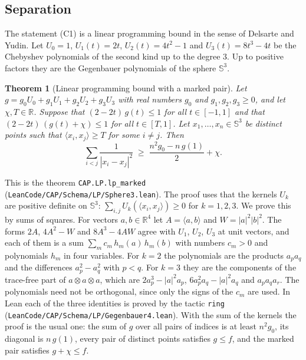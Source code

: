 \documentclass[reqno,a4paper,11pt]{amsart}
\numberwithin{equation}{section}
\newtheorem{theorem}{Theorem}[section]
\def\R{{\mathbb R}}
\newcommand{\Sph}{\mathbb{S}}
\newcommand{\lean}[1]{\texttt{#1}}
\newcommand{\file}[1]{\nolinkurl{#1}}
\begin{document}
\subsection{Separation}\label{sec:s3n9sep}

The statement (C1) is a linear programming bound in the sense of Delsarte and Yudin. Let $U_0 = 1$, $U_1(t) = 2t$, $U_2(t) = 4t^2 - 1$ and $U_3(t) = 8t^3 - 4t$ be the Chebyshev polynomials of the second kind up to the degree $3$. Up to positive factors they are the Gegenbauer polynomials of the sphere $\Sph^3$.

\begin{theorem}[Linear programming bound with a marked pair]\label{thm:lpmarked}
Let $g = g_0 U_0 + g_1 U_1 + g_2 U_2 + g_3 U_3$ with real numbers $g_0$ and $g_1, g_2, g_3 \geq 0$, and let $\chi, T \in \R$. Suppose that $(2-2t) \, g(t) \leq 1$ for all $t \in [-1,1]$ and that $(2-2t) \, (g(t) + \chi) \leq 1$ for all $t \in [T,1]$. Let $x_1, \dots, x_n \in \Sph^3$ be distinct points such that $\langle x_i, x_j \rangle \geq T$ for some $i \neq j$. Then
$$
\sum_{i<j} \frac{1}{|x_i - x_j|^2} \;\geq\; \frac{n^2 g_0 - n \, g(1)}{2} + \chi .
$$
\end{theorem}

This is the theorem \lean{CAP.LP.lp\_marked} (\file{LeanCode/CAP/Schema/LP/Sphere3.lean}). The proof uses that the kernels $U_k$ are positive definite on $\Sph^3$: $\sum_{i,j} U_k(\langle x_i, x_j \rangle) \geq 0$ for $k = 1, 2, 3$. We prove this by sums of squares. For vectors $a, b \in \R^4$ let $A = \langle a, b \rangle$ and $W = |a|^2 |b|^2$. The forms $2A$, $4A^2 - W$ and $8A^3 - 4AW$ agree with $U_1$, $U_2$, $U_3$ at unit vectors, and each of them is a sum $\sum_m c_m \, h_m(a) \, h_m(b)$ with numbers $c_m > 0$ and polynomials $h_m$ in four variables. For $k = 2$ the polynomials are the products $a_p a_q$ and the differences $a_p^2 - a_q^2$ with $p < q$. For $k = 3$ they are the components of the trace-free part of $a \otimes a \otimes a$, which are $2a_p^3 - |a|^2 a_p$, $6 a_p^2 a_q - |a|^2 a_q$ and $a_p a_q a_r$. The polynomials need not be orthogonal, since only the signs of the $c_m$ are used. In Lean each of the three identities is proved by the tactic \texttt{ring} (\file{LeanCode/CAP/Schema/LP/Gegenbauer4.lean}). With the sum of the kernels the proof is the usual one: the sum of $g$ over all pairs of indices is at least $n^2 g_0$, its diagonal is $n \, g(1)$, every pair of distinct points satisfies $g \leq f$, and the marked pair satisfies $g + \chi \leq f$.
\end{document}
